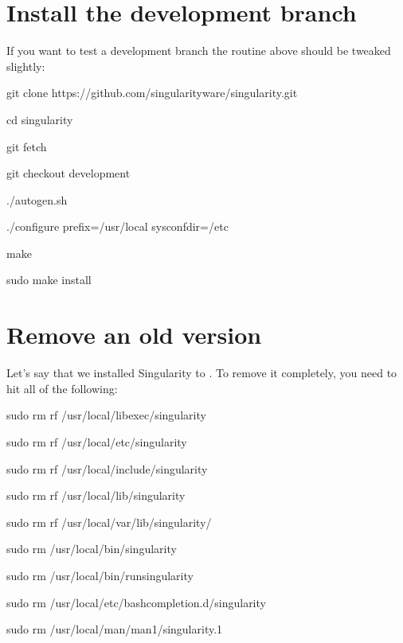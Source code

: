 \documentclass[letterpaper,10pt,english]{sphinxmanual}
\begin{document}
\section{Install the development branch}
\label{\detokenize{installation:install-the-development-branch}}
If you want to test a development branch the routine above should be
tweaked slightly:

%
\begin{sphinxVerbatim}[commandchars=\\\{\}]
\PYGZdl{} git clone https://github.com/singularityware/singularity.git

\PYGZdl{} cd singularity

\PYGZdl{} git fetch

\PYGZdl{} git checkout development

\PYGZdl{} ./autogen.sh

\PYGZdl{} ./configure \PYGZhy{}\PYGZhy{}prefix=/usr/local \PYGZhy{}\PYGZhy{}sysconfdir=/etc

\PYGZdl{} make

\PYGZdl{} sudo make install
\end{sphinxVerbatim}


\section{Remove an old version}
\label{\detokenize{installation:remove-an-old-version}}
Let’s say that we installed Singularity to . To remove it completely,
you need to hit all of the following:

%
\begin{sphinxVerbatim}[commandchars=\\\{\}]
\PYGZdl{} sudo rm \PYGZhy{}rf /usr/local/libexec/singularity

\PYGZdl{} sudo rm \PYGZhy{}rf /usr/local/etc/singularity

\PYGZdl{} sudo rm \PYGZhy{}rf /usr/local/include/singularity

\PYGZdl{} sudo rm \PYGZhy{}rf /usr/local/lib/singularity

\PYGZdl{} sudo rm \PYGZhy{}rf /usr/local/var/lib/singularity/

\PYGZdl{} sudo rm /usr/local/bin/singularity

\PYGZdl{} sudo rm /usr/local/bin/run\PYGZhy{}singularity

\PYGZdl{} sudo rm /usr/local/etc/bash\PYGZus{}completion.d/singularity

\PYGZdl{} sudo rm /usr/local/man/man1/singularity.1
\end{sphinxVerbatim}
\end{document}
